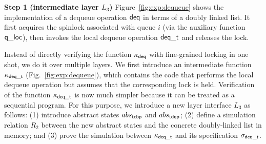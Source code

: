 \vspace{3pt}
\noindent\textbf{Step 1 (intermediate layer $L_3$)} 
Figure~\ref{fig:exp:dequeue} shows
the implementation of a dequeue operation $\mathsf{deq}$ in terms of a doubly linked
list.
It first acquires the spinlock associated with queue $i$
(via the auxiliary function $\mathsf{q\_loc}$),
then invokes the local dequeue operation $\mathsf{deq}\mathsf{\_t}$
and releases the lock.
Instead of directly verifying the function $\kappa_{\mathsf{deq}}$
with fine-grained locking in one shot, we do it over
multiple layers.
We first introduce an intermediate function
$\kappa_{\mathsf{deq}\mathsf{\_t}}$ (\cf Fig.~\ref{fig:exp:dequeue}), which contains
the code that performs the local dequeue operation but assumes that
the corresponding lock is held.
Verification of the function $\kappa_{\mathsf{deq}\mathsf{\_t}}$ is now much
simpler because it can be treated as a sequential program.
For this purpose, we introduce a new layer interface $L_3$ as follows:
(1) introduce abstract states $abs_{\mathsf{tcbp}}$ and $abs_{\mathsf{tdqp}}$;
(2) define a simulation relation $R_{2}$ between the new abstract states
and the concrete doubly-linked list in memory;
and (3) prove the simulation between
$\kappa_{\mathsf{deq}\mathsf{\_t}}$ and its specification
$\sigma_{\mathsf{deq}\mathsf{\_t}}$.

